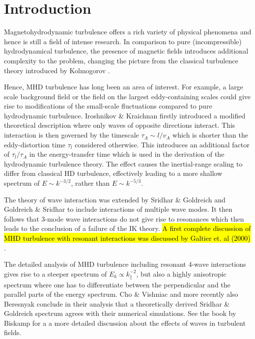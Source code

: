 \chapter{Introduction}\label{Chap:Intro}
Magnetohydrodynamic turbulence offers a rich variety of physical
phenomena and hence is still a field of intense research.  In
comparison to pure (incompressible) hydrodynamical turbulence, the
presence of magnetic fields introduces additional complexity to the
problem, changing the picture from the classical turbulence theory
introduced by Kolmogorov \citep{Kolmogorov41}.

Hence, MHD turbulence has long been an area of interest.
For example, a large scale background field or the field on the
largest eddy-containing scales could give rise to modifications of the
small-scale fluctuations compared to pure hydrodynamic turbulence.
Iroshnikov \cite{Iroshnikov1964} \& Kraichnan
\cite{Kraichnan1965b} firstly introduced a modified theoretical
description where only waves of opposite directions interact.
This interaction is then governed by the \alfven timescale
$\tau_A\sim l/v_A$ which is shorter than the eddy-distortion time
$\tau_l$ considered otherwise.  This introduces an additional factor
of $\tau_l/\tau_A$ in the energy-transfer time which is used in the
derivation of the hydrodynamic turbulence theory.  The \alfven effect
\citep{Iroshnikov1964,Kraichnan1965b} causes the inertial-range
scaling to differ from classical HD turbulence, effectively leading to
a more shallow spectrum of $E\sim k^{-3/2}$, rather than $E\sim k^{-5/3}$.

The theory of \alfvenic wave interaction was extended by Sridhar \&
Goldreich and Goldreich \& Sridhar 
\citep{SridharGoldreich94, SridharGoldreich95} to include interactions
of multiple \alfvenic wave modes.  It then follows that 3-mode wave
interactions do not give rise to resonances which then leads to the
conclusion of a failure of the IK theory. \hl{A first complete discussion of MHD
turbulence with resonant interactions was discussed by Galtier et. al (2000)} \cite{Galtier2000}.


The detailed analysis of MHD turbulence including resonant 4-wave
interactions gives rise to a steeper spectrum of
$E_k\propto k_{\|}^{-2}$, but also a highly anisotropic spectrum where
one has to differentiate between the perpendicular and the parallel
parts of the energy spectrum.  Cho \& Vishniac
\cite{ChoVishniac2000} and more recently also Beresnyak
\cite{Beresnyak15} conclude in their analysis that a theoretically
derived Sridhar \& Goldreich spectrum agrees with their numerical
simulations.  See the book by Biskamp \cite{BiskampBook} for a
a more detailed discussion about the effects of \alfvenic waves in
turbulent fields.

